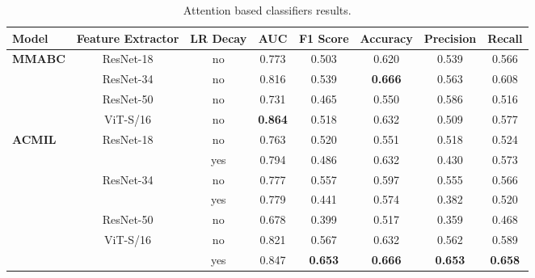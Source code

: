 \documentclass[
11pt, %
english, %
singlespacing, %
headsepline, %
]{project_structure}
\begin{document}

\begin{table}[ht]
    \centering
    \begin{tabular}{l|c|cccccc}
        \toprule
        \textbf{Model} & \textbf{Feature Extractor} & \textbf{LR Decay} & \textbf{AUC} & \textbf{F1 Score} & \textbf{Accuracy} & \textbf{Precision} & \textbf{Recall} \\
        \midrule
        \multirow{4}{*}{\textbf{\acrshort{MMABC}}} & ResNet-18 & no & 0.773 & 0.503 & 0.620 & 0.539 & 0.566 \\
                                              & ResNet-34 & no & 0.816 & 0.539 & \textbf{0.666} & 0.563 & 0.608 \\
        & ResNet-50 & no & 0.731 & 0.465 & 0.550 & 0.586 & 0.516 \\
                                              & ViT-S/16 & no & \textbf{0.864} & 0.518 & 0.632 & 0.509 & 0.577 \\
        \midrule
        \multirow{7}{*}{\textbf{\acrshort{ACMIL}}} & \multirow{2}{*}{ResNet-18} & no & 0.763 & 0.520 & 0.551 & 0.518 & 0.524 \\
                                              &                           & yes & 0.794 & 0.486 & 0.632 & 0.430 & 0.573 \\
                                              \cmidrule(l){2-8}
                                              & \multirow{2}{*}{ResNet-34} & no & 0.777 & 0.557 & 0.597 & 0.555 & 0.566 \\
                                              &                           & yes & 0.779 & 0.441 & 0.574 & 0.382 & 0.520 \\
                                              \cmidrule(l){2-8}
                                              & \multirow{1}{*}{ResNet-50} & no & 0.678 & 0.399 & 0.517 & 0.359 & 0.468 \\
                                              \cmidrule(l){2-8}
                                              & \multirow{2}{*}{ViT-S/16}      & no & 0.821 & 0.567 & 0.632 & 0.562& 0.589 \\
                                              &                           & yes & 0.847 & \textbf{0.653} & \textbf{0.666} & \textbf{0.653} & \textbf{0.658} \\
                                              
        \bottomrule
    \end{tabular}
    \caption{Attention based classifiers results.}
    \label{tab:abnn_metrics}
\end{table}
\end{document}
